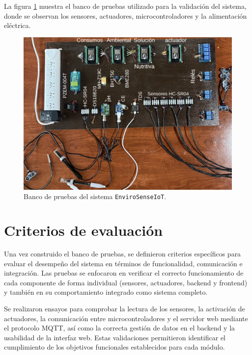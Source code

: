 La figura \ref{fig:banco_pruebas} muestra el banco de pruebas utilizado para la
validación del sistema, donde se observan los sensores, actuadores,
microcontroladores y la alimentación eléctrica.


\begin{figure}[H]
    \centering
    \includegraphics[width=\textwidth]{Images/36_prototipo.png}
    \caption[Banco de pruebas del sistema EnviroSenseIoT]{Banco de pruebas del sistema \texttt{EnviroSenseIoT}.}
    \label{fig:banco_pruebas}
\end{figure}

\section{Criterios de evaluación}

Una vez construido el banco de pruebas, se definieron criterios específicos
para evaluar el desempeño del sistema en términos de funcionalidad,
comunicación e integración. Las pruebas se enfocaron en verificar el correcto
funcionamiento de cada componente de forma individual (sensores, actuadores,
backend y frontend) y también en su comportamiento integrado como sistema
completo.

Se realizaron ensayos para comprobar la lectura de los sensores, la activación
de actuadores, la comunicación entre microcontroladores y el servidor web
mediante el protocolo MQTT, así como la correcta gestión de datos en el backend
y la usabilidad de la interfaz web. Estas validaciones permitieron identificar
el cumplimiento de los objetivos funcionales establecidos para cada módulo.

